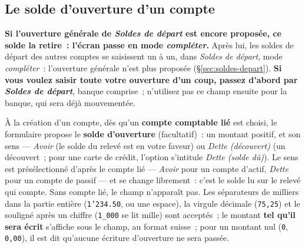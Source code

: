 \documentclass[a4paper,11pt,oneside]{article}
\begin{document}
\subsection{Le solde d'ouverture d'un compte}\label{sec:solde-ouverture-compte-bancaire}

\begin{keshwarning}
\textbf{Si l'ouverture générale de \emph{Soldes de départ} est encore proposée, ce solde la retire~: l'écran passe en mode \emph{compléter}.} Après lui, les soldes de départ des autres comptes se saisissent un à un, dans \emph{Soldes de départ}, mode \emph{compléter}~: l'ouverture générale n'est plus proposée (\S\ref{sec:soldes-depart}). \textbf{Si vous voulez saisir toute votre ouverture d'un coup, passez d'abord par \emph{Soldes de départ}}, banque comprise~; n'utilisez pas ce champ ensuite pour la banque, qui sera déjà mouvementée.
\end{keshwarning}

À la création d'un compte, dès qu'un \textbf{compte comptable lié} est choisi, le formulaire propose le \textbf{solde d'ouverture} (facultatif)~: un montant positif, et son sens --- \emph{Avoir} (le solde du relevé est en votre faveur) ou \emph{Dette (découvert)} (un découvert~; pour une carte de crédit, l'option s'intitule \emph{Dette (solde dû)}). Le sens est présélectionné d'après le compte lié --- \emph{Avoir} pour un compte d'actif, \emph{Dette} pour un compte de passif --- et se change librement~: c'est le solde lu sur le relevé qui compte. Sans compte lié, le champ n'apparaît pas. Les séparateurs de milliers dans la partie entière (\texttt{1'234.50}, ou une espace), la virgule décimale (\texttt{75,25}) et le souligné après un chiffre (\texttt{1\_000} se lit mille) sont acceptés~; le montant \textbf{tel qu'il sera écrit} s'affiche sous le champ, au format suisse~; pour un montant nul (\texttt{0}, \texttt{0,00}), il est dit qu'aucune écriture d'ouverture ne sera passée.
\end{document}
